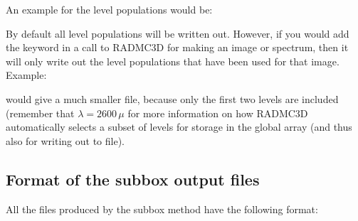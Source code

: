 \documentclass[letterpaper,10pt,english]{sphinxmanual}
\begin{document}
An example for the level populations would be:

\begin{sphinxVerbatim}[commandchars=\\\{\}]
            
\end{sphinxVerbatim}

 By default all level populations will
be written out. However, if you would add the  keyword in a
call to RADMC\sphinxhyphen{}3D for making an image or spectrum, then it will only write out
the level populations that have been used for that image. Example:

\begin{sphinxVerbatim}[commandchars=\\\{\}]
               
\end{sphinxVerbatim}

would give a much smaller  file, because only the
first two levels are included (remember that \(\lambda=2600\,\mu\) for more information
on how RADMC\sphinxhyphen{}3D automatically selects a subset of levels for storage in the
global array (and thus also for writing out to file).


\subsection{Format of the subbox output files}
\label{\detokenize{toolsinside:format-of-the-subbox-output-files}}
All the files produced by the subbox method have the following format:
\end{document}
